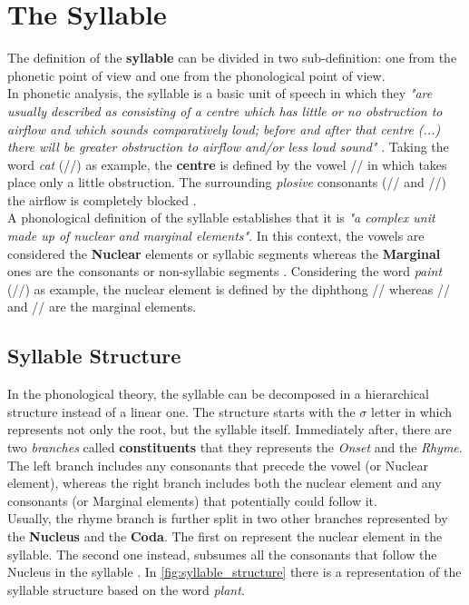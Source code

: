 \section{The Syllable}
\label{sec:The syllable}
The definition of the \textbf{syllable} can be divided in two sub-definition: one from the phonetic point of view and one from the phonological point of view. \\
\noindent In phonetic analysis, the syllable is a basic unit of speech in which they \textit{"are usually described as consisting of a centre which has little or no obstruction to airflow and which sounds comparatively loud; before and after that centre (...) there will be greater obstruction to airflow and/or less loud sound"} \cite{roach2000phonology}. Taking the word \textit{cat} (//) as example, the \textbf{centre} is defined by the vowel /\textipa{\ae}/ in which takes place only a little obstruction. The surrounding \textit{plosive} consonants (// and //) the airflow is completely blocked \cite{syllable_site}. \\
\noindent A phonological definition of the syllable establishes that it is \textit{"a complex unit made up of nuclear and marginal elements"}\cite{laver1994principles}. In this context, the vowels are considered the \textbf{Nuclear} elements or syllabic segments whereas the \textbf{Marginal} ones are the consonants or non-syllabic segments \cite{syllable_site}. Considering the word \textit{paint} (//) as example, the nuclear element is defined by the diphthong // whereas // and // are the marginal elements.

\subsection{Syllable Structure}
In the phonological theory, the syllable can be decomposed in a hierarchical structure instead of a linear one. The structure starts with the $\sigma$ letter in which represents not only the root, but the syllable itself. Immediately after, there are two \textit{branches} called \textbf{constituents} that they represents the \textit{Onset} and the \textit{Rhyme}. The left branch includes any consonants that precede the vowel (or Nuclear element), whereas the right branch includes both the nuclear element and any consonants (or Marginal elements) that potentially could follow it. \\
\noindent Usually, the rhyme branch is further split in two other branches represented by the \textbf{Nucleus} and the \textbf{Coda}. The first on represent the nuclear element in the syllable. The second one instead, subsumes all the consonants that follow the Nucleus in the syllable \cite{syllable_site}. In \ref{fig:syllable_structure} there is a representation of the syllable structure based on the word \textit{plant}.

